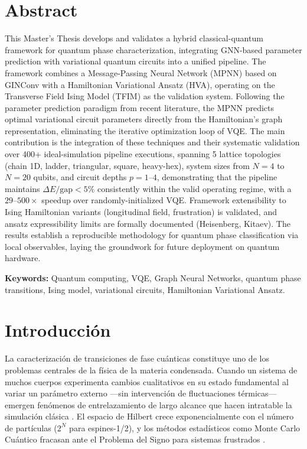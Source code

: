 \documentclass[11pt,a4paper,spanish]{book}
\begin{document}
\chapter{Abstract}

This Master's Thesis develops and validates a hybrid classical-quantum framework for quantum phase characterization, integrating GNN-based parameter prediction with variational quantum circuits into a unified pipeline. The framework combines a Message-Passing Neural Network (MPNN) based on GINConv with a Hamiltonian Variational Ansatz (HVA), operating on the Transverse Field Ising Model (TFIM) as the validation system. Following the parameter prediction paradigm from recent literature, the MPNN predicts optimal variational circuit parameters directly from the Hamiltonian's graph representation, eliminating the iterative optimization loop of VQE. The main contribution is the integration of these techniques and their systematic validation over 400+ ideal-simulation pipeline executions, spanning 5 lattice topologies (chain 1D, ladder, triangular, square, heavy-hex), system sizes from $N=4$ to $N=20$ qubits, and circuit depths $p = 1$--$4$, demonstrating that the pipeline maintains $\Delta E/\text{gap} < 5\%$ consistently within the valid operating regime, with a $29$--$500\times$ speedup over randomly-initialized VQE. Framework extensibility to Ising Hamiltonian variants (longitudinal field, frustration) is validated, and ansatz expressibility limits are formally documented (Heisenberg, Kitaev). The results establish a reproducible methodology for quantum phase classification via local observables, laying the groundwork for future deployment on quantum hardware.

\vspace{0.5cm}
{\bf Keywords:} Quantum computing, VQE, Graph Neural Networks, quantum phase transitions, Ising model, variational circuits, Hamiltonian Variational Ansatz.

\mainmatter


\chapter{Introducción}

La caracterización de transiciones de fase cuánticas constituye uno de los problemas centrales de la física de la materia condensada. Cuando un sistema de muchos cuerpos experimenta cambios cualitativos en su estado fundamental al variar un parámetro externo ---sin intervención de fluctuaciones térmicas--- emergen fenómenos de entrelazamiento de largo alcance que hacen intratable la simulación clásica \citep{dutta2015, anderson1972}. El espacio de Hilbert crece exponencialmente con el número de partículas ($2^N$ para espines-1/2), y los métodos estadísticos como Monte Carlo Cuántico fracasan ante el Problema del Signo para sistemas frustrados \citep{troyer2005}.
\end{document}
